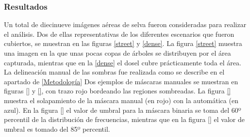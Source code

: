 \subsubsection{Resultados} \label{Resultados}
Un total de diecinueve imágenes aéreas de selva fueron consideradas para realizar el análisis. Dos de ellas representativas de los diferentes escenarios que fueron cubiertos, se muestran en las figuras \ref{street} y \ref{dense}. La figura \ref{street} muestra una imagen en la que unas pocas copas de árboles se distribuyen por el área capturada, mientras que en la \ref{dense} el dosel cubre prácticamente toda el área. La delineación manual de las sombras fue realizada como se describe en el apartado de \ref{Metodología}
Dos ejemplos de máscaras manuales se muestran en figuras \ref{} y \ref{}, con trazo rojo bordeando las regiones sombreadas. La figura \ref{} muestra el solapamiento de la máscara manual (en rojo) con la automática (en azul). En la figura \ref{} el valor de umbral para la máscara binaria se toma del 60º percentil de la distribución de frecuencias, mientras que en la figura \ref{} el valor de umbral es tomado del 85º percentil.

